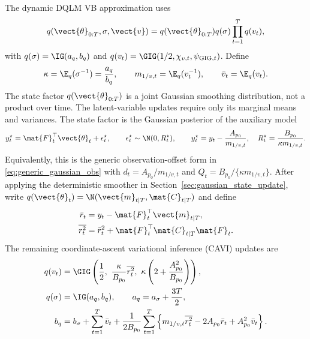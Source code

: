 The dynamic DQLM VB approximation uses
\begin{equation}
q(\vect{\theta}_{0:T},\sigma,\vect{v})
=q(\vect{\theta}_{0:T})q(\sigma)\prod_{t=1}^Tq(v_t),
\label{eq:dyn_dqlm_mf}
\end{equation}
with $q(\sigma)=\IG(a_q,b_q)$ and
$q(v_t)=\GIG(1/2,\chi_{v,t},\psi_{\mathrm{GIG},t})$. Define
\begin{equation}
\kappa=\E_q(\sigma^{-1})=\frac{a_q}{b_q},\qquad
m_{1/v,t}=\E_q(v_t^{-1}),\qquad
\bar v_t=\E_q(v_t).
\end{equation}
The state factor $q(\vect{\theta}_{0:T})$ is a joint Gaussian smoothing
distribution, not a product over time. The latent-variable updates require
only its marginal means and variances.
The state factor is the Gaussian posterior of the auxiliary model
\begin{equation}
y_t^\star=\mat{F}_t^\top\vect{\theta}_t+\epsilon_t^\star,\qquad
\epsilon_t^\star\sim\N(0,R_t^\star),
\qquad
y_t^\star=y_t-\frac{A_{p_0}}{m_{1/v,t}},\quad
R_t^\star=\frac{B_{p_0}}{\kappa m_{1/v,t}}.
\label{eq:dyn_dqlm_vb_pseudo}
\end{equation}
Equivalently, this is the generic observation-offset form in
\eqref{eq:generic_gaussian_obs} with
$d_t=A_{p_0}/m_{1/v,t}$ and
$Q_t=B_{p_0}/\{\kappa m_{1/v,t}\}$.
After applying the deterministic smoother in
Section~\ref{sec:gaussian_state_update}, write
$q(\vect{\theta}_t)=\N(\vect{m}_{t|T},\mat{C}_{t|T})$ and define
\begin{align}
\bar r_t &= y_t-\mat{F}_t^\top\vect{m}_{t|T},\\
\overline{r_t^2}
&= \bar r_t^2+\mat{F}_t^\top\mat{C}_{t|T}\mat{F}_t.
\end{align}
The remaining coordinate-ascent variational inference (CAVI) updates are
\begin{align}
q(v_t)&=\GIG\left(
\frac{1}{2},\
\frac{\kappa}{B_{p_0}}\overline{r_t^2},\
\kappa\left(2+\frac{A_{p_0}^2}{B_{p_0}}\right)\right), \\
q(\sigma)&=\IG(a_q,b_q), \qquad
a_q=a_\sigma+\frac{3T}{2},\\
b_q&=b_\sigma+\sum_{t=1}^T\bar v_t+
\frac{1}{2B_{p_0}}\sum_{t=1}^T
\left\{m_{1/v,t}\overline{r_t^2}-2A_{p_0}\bar r_t+A_{p_0}^2\bar v_t\right\}.
\label{eq:dyn_dqlm_vb_sigma}
\end{align}

